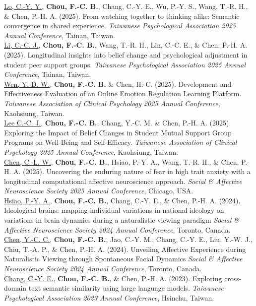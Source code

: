 \documentclass[a4paper,12pt]{article}
\newcommand{\itemspace}{7pt} %
\begin{document}
\noindent \underline{Lo, C.-Y. Y.}, \textbf{Chou, F.-C. B.}, Chang, C.-Y. E., Wu, P.-Y. S., Wang, T.-R. H., \& Chen, P.-H. A. (2025). From watching together to thinking alike: Semantic convergence in shared experience. \textit{Taiwanese Psychological Association 2025 Annual Conference}, Tainan, Taiwan. \\[\itemspace]
\noindent \underline{Li, C.-C. J.}, \textbf{Chou, F.-C. B.}, Wang, T.-R. H., Lin, C.-C. E., \& Chen, P.-H. A. (2025). Longitudinal insights into belief change and psychological adjustment in student peer support groups. \textit{Taiwanese Psychological Association 2025 Annual Conference}, Tainan, Taiwan. \\[\itemspace]
\noindent \underline{Wen, Y.-D. W.}, \textbf{Chou, F.-C. B.} \& Chen, H.-C. (2025). Development and Effectiveness Evaluation of an Online Emotion Regulation Learning Platform. \textit{Taiwanese Association of Clinical Psychology 2025 Annual Conference}, Kaohsiung, Taiwan. \\[\itemspace]
\noindent \underline{Lee C.-C. J.}, \textbf{Chou, F.-C. B.}, Chang, Y.-C. M. \& Chen, P.-H. A. (2025). Exploring the Impact of Belief Changes in Student Mutual Support Group Programs on Well-Being and Self-Efficacy. \textit{Taiwanese Association of Clinical Psychology 2025 Annual Conference}, Kaohsiung, Taiwan. \\[\itemspace]
\noindent \underline{Chen, C.-L. W.}, \textbf{Chou, F.-C. B.}, Hsiao, P.-Y. A., Wang, T.-R. H., \& Chen, P.-H. A. (2025). Uncovering the enduring nature of fear in high trait anxiety with a longitudinal computational affective neuroscience approach. \textit{Social \& Affective Neuroscience Society 2025 Annual Conference}, Chicago, USA. \\[\itemspace]
\noindent \underline{Hsiao, P.-Y. A.}, \textbf{Chou, F.-C. B.}, Chang, C.-Y. E., \& Chen, P.-H. A. (2024). Ideological brains: mapping individual variations in national ideology on variations in brain dynamics during a naturalistic viewing paradigm \textit{Social \& Affective Neuroscience Society 2024 Annual Conference}, Toronto, Canada. \\[\itemspace]
\noindent \underline{Chen, Y.-C. C.}, \textbf{Chou, F.-C. B.}, Jao, C.-Y. M., Chang, C.-Y. E., Liu, Y.-W. J., Chiu, T.-A. P., \& Chen, P.-H. A. (2024). Unveiling Affective Experience during Naturalistic Viewing through Spontaneous Facial Dynamics \textit{Social \& Affective Neuroscience Society 2024 Annual Conference}, Toronto, Canada. \\[\itemspace]
\noindent \underline{Chang, C.-Y. E.}, \textbf{Chou, F.-C. B.}, \& Chen, P.-H. A. (2023). Exploring cross-domain text semantic similarity using large language models. \textit{Taiwanese Psychological Association 2023 Annual Conference}, Hsinchu, Taiwan.\\[\itemspace]
\end{document}
